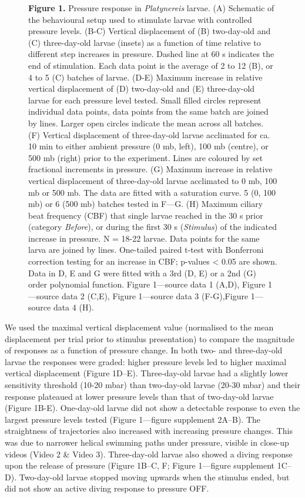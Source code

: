 \documentclass[
  11pt,
]{article}
\begin{document}
\begin{figure}[H]
\caption{\textbf{Figure 1.} Pressure response in \emph{Platynereis}
larvae. (A) Schematic of the behavioural setup used to stimulate larvae
with controlled pressure levels. (B-C) Vertical displacement of (B)
two-day-old and (C) three-day-old larvae (insets) as a function of time
relative to different step increases in pressure. Dashed line at 60 s
indicates the end of stimulation. Each data point is the average of 2 to
12 (B), or 4 to 5 (C) batches of larvae. (D-E) Maximum increase in
relative vertical displacement of (D) two-day-old and (E) three-day-old
larvae for each pressure level tested. Small filled circles represent
individual data points, data points from the same batch are joined by
lines. Larger open circles indicate the mean across all batches. (F)
Vertical displacement of three-day-old larvae acclimated for ca. 10 min
to either ambient pressure (0 mb, left), 100 mb (centre), or 500 mb
(right) prior to the experiment. Lines are coloured by set fractional
increments in pressure. (G) Maximum increase in relative vertical
displacement of three-day-old larvae acclimated to 0 mb, 100 mb or 500
mb. The data are fitted with a saturation curve. 5 (0, 100 mb) or 6 (500
mb) batches tested in F---G. (H) Maximum ciliary beat frequency (CBF)
that single larvae reached in the 30 s prior (category \emph{Before}),
or during the first 30 s (\emph{Stimulus}) of the indicated increase in
pressure. N = 18-22 larvae. Data points for the same larva are joined by
lines. One-tailed paired t-test with Bonferroni correction testing for
an increase in CBF; p-values \textless{} 0.05 are shown. Data in D, E
and G were fitted with a 3rd (D, E) or a 2nd (G) order polynomial
function. Figure 1---source data 1 (A,D), Figure 1---source data 2
(C,E), Figure 1---source data 3 (F-G),Figure 1---source data 4 (H).}

\end{figure}%

We used the maximal vertical displacement value (normalised to the mean
displacement per trial prior to stimulus presentation) to compare the
magnitude of responses as a function of pressure change. In both two-
and three-day-old larvae the responses were graded: higher pressure
levels led to higher maximal vertical displacement (Figure 1D--E).
Three-day-old larvae had a slightly lower sensitivity threshold (10-20
mbar) than two-day-old larvae (20-30 mbar) and their response plateaued
at lower pressure levels than that of two-day-old larvae (Figure 1B-E).
One-day-old larvae did not show a detectable response to even the
largest pressure levels tested (Figure 1---figure supplement 2A--B). The
straightness of trajectories also increased with increasing pressure
changes. This was due to narrower helical swimming paths under pressure,
visible in close-up videos (Video 2 \& Video 3). Three-day-old larvae
also showed a diving response upon the release of pressure (Figure
1B--C, F; Figure 1---figure supplement 1C--D). Two-day-old larvae
stopped moving upwards when the stimulus ended, but did not show an
active diving response to pressure OFF.
\end{document}
